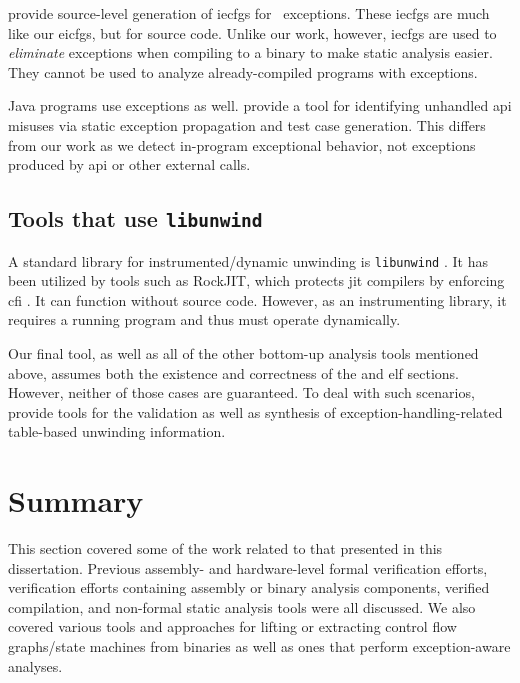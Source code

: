 \Textcite{prabhu2011interprocedural} provide source-level generation of \acp{iecfg} for \Cpp\ exceptions.
These \acp{iecfg} are much like our \acp{eicfg}, but for source code.
Unlike our work, however, \acp{iecfg} are used to \emph{eliminate} exceptions when compiling to a binary to make static analysis easier.
They cannot be used to analyze already-compiled programs with exceptions.

Java programs use exceptions as well. \Textcite{kechagia2019misuse} provide a tool for identifying unhandled \ac{api} misuses via static exception propagation and test case generation. This differs from our work as we detect in-program exceptional behavior, not exceptions produced by \ac{api} or other external calls.

\subsection{Tools that use \texttt{libunwind}}
A standard library for instrumented/dynamic unwinding is \lstinline|libunwind| \autocite{libunwind}.
It has been utilized by tools such as RockJIT, which protects \ac{jit} compilers by enforcing \ac{cfi} \autocite{niu2014rockjit}.
It can function without source code. However, as an instrumenting library, it requires a running program and thus must operate dynamically.

Our final tool, as well as all of the other bottom-up analysis tools mentioned above, assumes both the existence and correctness of the  and  \ac{elf} sections.
However, neither of those cases are guaranteed.
To deal with such scenarios, \textcite{bastian2019dwarf} provide tools for the validation as well as synthesis of exception-handling-related table-based unwinding information.

%
%
%
%

\section{Summary}
This section covered some of the work related to that presented in this dissertation.
Previous assembly- and hardware-level formal verification efforts,
verification efforts containing assembly or binary analysis components,
verified compilation, and non-formal static analysis tools were all discussed.
We also covered various tools and approaches for lifting or extracting control flow graphs/state machines from binaries as well as ones that perform exception-aware analyses.

